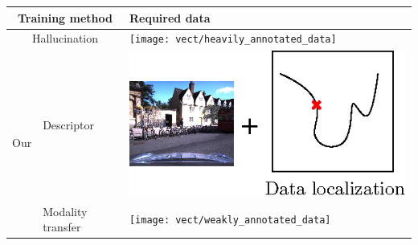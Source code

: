 \begin{tabularx}{\linewidth}{m{1cm} | m{1cm} | X}
	\multicolumn{2}{c|}{Training method} & Required data \\
	\hline
	\multicolumn{2}{c|}{Hallucination} 	& \texttt{[image: vect/heavily\_annotated\_data]} \\
	\hline
	\multirow{2}{*}{Our} & Descriptor & \includegraphics[width=\textwidth]{vect/annotated_data} \\
	\hline
						 & Modality transfer & \texttt{[image: vect/weakly\_annotated\_data]}  \\
\end{tabularx}